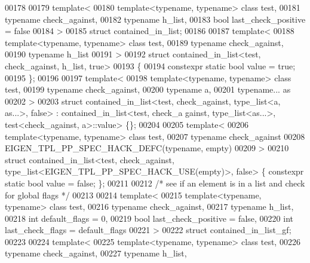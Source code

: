 \begin{DoxyCode}
00178 
00179 template<
00180   template<typename, typename> class test,
00181   typename check\_against,
00182   typename h\_list,
00183   \textcolor{keywordtype}{bool} last\_check\_positive = false
00184 >
00185 struct contained\_in\_list;
00186 
00187 template<
00188   template<typename, typename> class test,
00189   typename check\_against,
00190   typename h\_list
00191 >
00192 struct contained\_in\_list<test, check\_against, h\_list, true>
00193 \{
00194   constexpr \textcolor{keyword}{static} \textcolor{keywordtype}{bool} value = \textcolor{keyword}{true};
00195 \};
00196 
00197 \textcolor{keyword}{template}<
00198   \textcolor{keyword}{template}<\textcolor{keyword}{typename}, \textcolor{keyword}{typename}> \textcolor{keyword}{class }test,
00199   \textcolor{keyword}{typename} check\_against,
00200   \textcolor{keyword}{typename} a,
00201   \textcolor{keyword}{typename}... as
00202 >
00203 \textcolor{keyword}{struct }contained\_in\_list<test, check\_against, type\_list<a, as...>, false> : contained\_in\_list<test, check\_a
      gainst, type\_list<as...>, test<check\_against, a>::value> \{\};
00204 
00205 \textcolor{keyword}{template}<
00206   \textcolor{keyword}{template}<\textcolor{keyword}{typename}, \textcolor{keyword}{typename}> \textcolor{keyword}{class }test,
00207   \textcolor{keyword}{typename} check\_against
00208   EIGEN\_TPL\_PP\_SPEC\_HACK\_DEFC(\textcolor{keyword}{typename}, empty)
00209 >
00210 \textcolor{keyword}{struct }contained\_in\_list<test, check\_against, type\_list<EIGEN\_TPL\_PP\_SPEC\_HACK\_USE(empty)>, false> \{ 
      constexpr \textcolor{keyword}{static} \textcolor{keywordtype}{bool} value = \textcolor{keyword}{false}; \};
00211 
00212 \textcolor{comment}{/* see if an element is in a list and check for global flags */}
00213 
00214 \textcolor{keyword}{template}<
00215   \textcolor{keyword}{template}<\textcolor{keyword}{typename}, \textcolor{keyword}{typename}> \textcolor{keyword}{class }test,
00216   \textcolor{keyword}{typename} check\_against,
00217   \textcolor{keyword}{typename} h\_list,
00218   \textcolor{keywordtype}{int} default\_flags = 0,
00219   \textcolor{keywordtype}{bool} last\_check\_positive = \textcolor{keyword}{false},
00220   \textcolor{keywordtype}{int} last\_check\_flags = default\_flags
00221 >
00222 \textcolor{keyword}{struct }contained\_in\_list\_gf;
00223 
00224 \textcolor{keyword}{template}<
00225   \textcolor{keyword}{template}<\textcolor{keyword}{typename}, \textcolor{keyword}{typename}> \textcolor{keyword}{class }test,
00226   \textcolor{keyword}{typename} check\_against,
00227   \textcolor{keyword}{typename} h\_list,

\end{DoxyCode}

